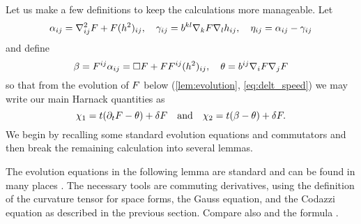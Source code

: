 \documentclass{amsart}
\begin{document}
Let us make a few definitions to keep the calculations more manageable. Let
\[
\alpha_{ij} = \nabla^2_{ij} F + F(h^2)_{ij}, \quad \gamma_{ij} = b^{kl} \nabla_k F \nabla_l h_{ij}, \quad \eta_{ij} = \alpha_{ij} - \gamma_{ij}
\]
and define
\[
\beta = F^{ij} \alpha_{ij} = \Box F + F F^{ij}(h^2)_{ij}, \quad \theta =  b^{ij} \nabla_i F \nabla_j F
\]
so that from the evolution of \(F\) below (\cref{lem:evolution}, \cref{eq:delt_speed}) we may write our main Harnack quantities as
\[
\chi_1 = t(\partial_tF- \theta) + \delta F
\quad \mbox{and}\quad
\chi_2 = t(\beta - \theta) + \delta F.
\]
We begin by recalling some standard evolution equations and commutators and then break the remaining calculation into several lemmas.

The evolution equations in the following lemma are standard and can be found in many places \cite{Andrews:09/1994, Chow:06/1991, Hamilton:/1995, Huisken:/1987a, Smoczyk:/1997}. The necessary tools are commuting derivatives, using the definition of the curvature tensor for space forms, the Gauss equation, and the Codazzi equation as described in the previous section. Compare also \cite[p.~94-95]{Gerhardt:/2006} and the formula \cite[eq.~(6.17)]{Gerhardt:01/1996}.
\end{document}
